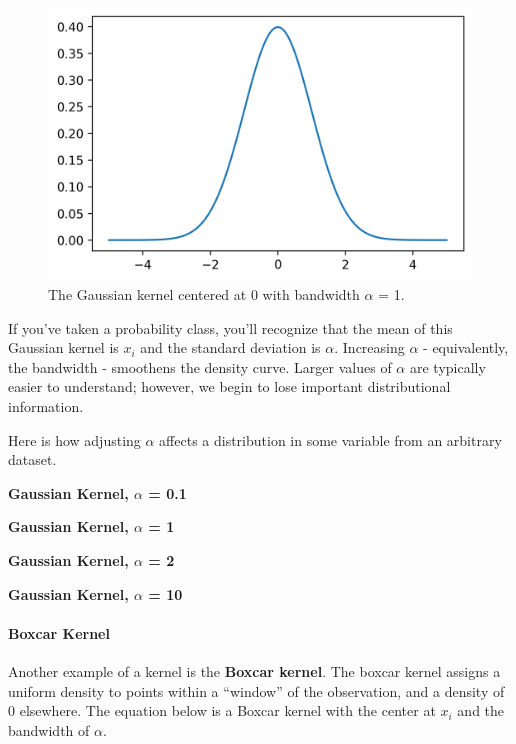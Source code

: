 \documentclass[
  letterpaper,
  DIV=11,
  numbers=noendperiod]{scrreprt}
\let\oldparagraph\paragraph
\renewcommand{\paragraph}[1]{\oldparagraph{#1}\mbox{}}
\begin{document}
\begin{figure}[H]

{\centering \includegraphics{visualization_2/visualization_2_files/figure-pdf/cell-5-output-1.png}

}

\caption{The Gaussian kernel centered at 0 with bandwidth \(\alpha\) =
1.}

\end{figure}

If you've taken a probability class, you'll recognize that the mean of
this Gaussian kernel is \(x_i\) and the standard deviation is
\(\alpha\). Increasing \(\alpha\) - equivalently, the bandwidth -
smoothens the density curve. Larger values of \(\alpha\) are typically
easier to understand; however, we begin to lose important distributional
information.

Here is how adjusting \(\alpha\) affects a distribution in some variable
from an arbitrary dataset.

\textbf{Gaussian Kernel, \(\alpha\) = 0.1}

\textbf{Gaussian Kernel, \(\alpha\) = 1}

\textbf{Gaussian Kernel, \(\alpha\) = 2}

\textbf{Gaussian Kernel, \(\alpha\) = 10}

\hypertarget{boxcar-kernel}{%
\paragraph{Boxcar Kernel}\label{boxcar-kernel}}

Another example of a kernel is the \textbf{Boxcar kernel}. The boxcar
kernel assigns a uniform density to points within a ``window'' of the
observation, and a density of 0 elsewhere. The equation below is a
Boxcar kernel with the center at \(x_i\) and the bandwidth of
\(\alpha\).
\end{document}
